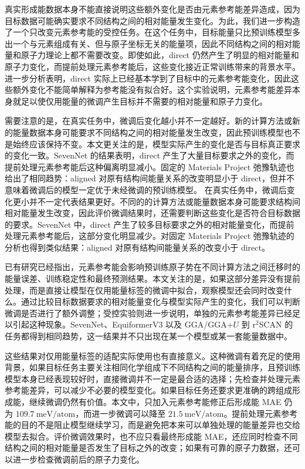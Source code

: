 \documentclass[UTF8,a4paper,12pt,fontset=fandol]{ctexart}
\begin{document}
真实形成能数据本身不能直接说明这些额外变化是否由元素参考能差异造成，因为目标数据可能确实要求不同结构之间的相对能量发生变化。为此，我们进一步构造了一个只改变元素参考能的受控任务。在这个任务中，目标能量只比预训练模型多出一个与元素组成有关、但与原子坐标无关的能量项，因此不同结构之间的相对能量和原子力理论上都不需要改变。即使如此，direct 仍然产生了明显的相对能量和原子力变化，而提前处理元素参考能后，这些变化接近正常训练带来的背景水平。进一步分析表明，direct 实际上已经基本学到了目标中的元素参考能变化，因此这些额外变化不能简单解释为参考能没有拟合好。这个实验说明，元素参考能差异本身就足以使仅用能量的微调产生目标并不需要的相对能量和原子力变化。

需要注意的是，在真实任务中，微调后变化越小并不一定越好。新的计算方法或新的能量数据本身可能要求不同结构之间的相对能量发生改变，因此预训练模型也不是始终应该保持不变。本文更关注的是，模型实际产生的变化是否与目标真正要求的变化一致。SevenNet 的结果表明，direct 产生了大量目标要求之外的变化，而提前处理元素参考能后这种偏离明显减小。固定的 Materials Project 弛豫轨迹也给出了相同趋势：aligned 对原有结构间能量关系的改变明显小于 direct，但并不意味着微调后的模型一定优于未经微调的预训练模型。
在真实任务中，微调后变化更小并不一定代表结果更好。不同的的计算方法或能量数据本身可能要求结构间相对能量发生改变，因此评价微调结果时，还需要判断这些变化是否符合目标数据的要求。SevenNet 中，direct 产生了较多目标要求之外的相对能量变化，而提前处理元素参考能后，这部分变化明显减少。对固定 Materials Project 弛豫轨迹的分析也得到类似结果：aligned 对原有结构间能量关系的改变小于 direct。

已有研究已经指出，元素参考能会影响预训练原子势在不同计算方法之间迁移时的能量误差、训练稳定性和最终预测结果\cite{huang_transfer}。本文关注的是，如果这部分差异没有提前处理，而是直接让模型在仅用能量标签的微调中拟合，观察模型还会同时改变什么。通过比较目标数据要求的相对能量变化与模型实际产生的变化，我们可以判断微调是否进行了额外调整；受控实验则进一步说明，单独的元素参考能差异已经足以引起这种现象。SevenNet、EquiformerV3 以及 GGA/GGA+$U$  到 r$^2$SCAN 的任务都得到相同趋势，这一结果并不只出现在某一个模型或某一套能量数据中。

这些结果对仅用能量标签的适配实际使用也有直接意义。这种微调有着充足的使用背景，如果目标任务主要关注相同化学组成下不同结构之间的能量排序，且预训练模型本身已经表现较好时，直接微调并不一定是最合适的选择；先检查并处理元素参考能差异，可以减少不必要的模型变化。如果目标任务还要求更准确的跨组成形成能，继续微调仍然有价值。本文中，只加入元素参考能修正后形成能 MAE 仍为 \(109.7~\mathrm{meV/atom}\)，而进一步微调可以降至 \(21.5~\mathrm{meV/atom}\)。提前处理元素参考能的目的不是阻止模型继续学习，而是避免把本来可以单独处理的能量差异也交给模型去拟合。评价微调效果时，也不应只看最终形成能 MAE，还应同时检查不同结构之间的相对能量是否发生了目标之外的改变；如果有可靠的原子力数据，还可以进一步检查微调前后的原子力变化。
\end{document}
